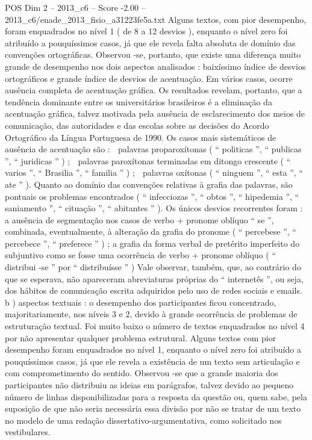 \begin{textsample}{POS Dim 2 – 2013\_c6 – Score -2.00 – 2013\_c6/enade\_2013\_fisio\_a31223fe5a.txt}
Alguns textos, com pior desempenho, foram enquadrados no nível 1 ( de 8 a 12 desvios ), enquanto o nível zero foi atribuído a pouquíssimos casos, já que ele revela falta absoluta de domínio das convenções ortográficas.
Observou -se, portanto, que existe uma diferença muito grande de desempenho nos dois aspectos analisados : baixíssimo índice de desvios ortográficos e grande índice de desvios de acentuação.
Em vários casos, ocorre ausência completa de acentuação gráfica.
Os resultados revelam, portanto, que a tendência dominante entre os universitários brasileiros é a eliminação da acentuação gráfica, talvez motivada pela ausência de esclarecimento dos meios de comunicação, das autoridades e das escolas sobre as decisões do Acordo Ortográfico da Língua Portuguesa de 1990.
Os casos mais sistemáticos de ausência de acentuação são :  palavras proparoxítonas ( “ politicas ”, “ publicas ”, “ juridicas ” ) ;  palavras paroxítonas terminadas em ditongo crescente ( “ varios ”, “ Brasilia ”, “ familia ” ) ;  palavras oxítonas ( “ ninguem ”, “ esta ”, “ ate ” ).
Quanto ao domínio das convenções relativas à grafia das palavras, são pontuais os problemas encontrados ( “ infecciozas ”, “ obtos ”, “ hipedemia ”, “ saniamento ”, “ cituação ”, “ abitantes ” ).
Os únicos desvios recorrentes foram : a ausência de segmentação nos casos de verbo + pronome oblíquo “ se ”, combinada, eventualmente, à alteração da grafia do pronome ( “ percebese ”, “ percebece ”, “ preferece ” ) ; a grafia da forma verbal de pretérito imperfeito do subjuntivo como se fosse uma ocorrência de verbo + pronome oblíquo ( “ distribui -se ” por “ distribuísse ” ) Vale observar, também, que, ao contrário do que se esperava, não apareceram abreviaturas próprias do “ internetês ”, ou seja, dos hábitos de comunicação escrita adquiridos pelo uso de redes sociais e emails. b ) aspectos textuais : o desempenho dos participantes ficou concentrado, majoritariamente, nos níveis 3 e 2, devido à grande ocorrência de problemas de estruturação textual.
Foi muito baixo o número de textos enquadrados no nível 4 por não apresentar qualquer problema estrutural.
Alguns textos com pior desempenho foram enquadrados no nível 1, enquanto o nível zero foi atribuído a pouquíssimos casos, já que ele revela a existência de um texto sem articulação e com comprometimento do sentido.
Observou -se que a grande maioria dos participantes não distribuiu as ideias em parágrafos, talvez devido ao pequeno número de linhas disponibilizadas para a resposta da questão ou, quem sabe, pela suposição de que não seria necessária essa divisão por não se tratar de um texto no modelo de uma redação dissertativo-argumentativa, como solicitado nos vestibulares.

\end{textsample}
